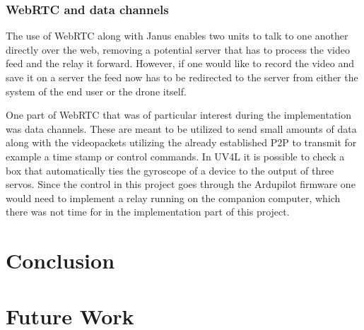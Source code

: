 \documentclass[nofilelist]{cslthse-msc}
\begin{document}
\subsection{WebRTC and data channels}
The use of WebRTC along with Janus enables two units to talk to one another directly over the web, removing a potential server that has to process the video feed and the relay it forward. However, if one would like to record the video and save it on a server the feed now has to be redirected to the server from either the system of the end user or the drone itself. 

One part of WebRTC that was of particular interest during the implementation was data channels. These are meant to be utilized to send small amounts of data along with the videopackets utilizing the already established P2P to transmit for example a time stamp or control commands. In UV4L it is possible to check a box that automatically ties the gyroscope of a device to the output of three servos. Since the control in this project goes through the Ardupilot firmware one would need to implement a relay running on the companion computer, which there was not time for in the implementation part of this project. 

\chapter{Conclusion}

\chapter{Future Work}


{}
\end{document}
